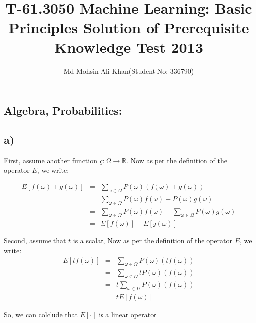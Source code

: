 \documentclass{article}
\begin{document}
\title{T-61.3050 Machine Learning: Basic Principles 
Solution of Prerequisite Knowledge Test 2013
}
\author{Md Mohsin Ali Khan(Student No: 336790)}

\maketitle


\begin{scriptsize}


\section{Algebra, Probabilities:}

\subsection*{a)}


First, assume another function $g:\Omega \rightarrow \mathbb{R}$. Now as per the definition of the operator $E$, we write:

\begin{eqnarray*}
E[f(\omega) + g(\omega)] &=& \sum_{\omega \in \Omega} P(\omega)(f(\omega)+g(\omega)) \\
&=& \sum_{\omega \in \Omega} P(\omega)f(\omega)+ P(\omega)g(\omega) \\
&=& \sum_{\omega \in \Omega} P(\omega)f(\omega)+ \sum_{\omega \in \Omega}P(\omega)g(\omega) \\
&=& E[f(\omega)] + E[g(\omega)]
\end{eqnarray*}

Second, assume that $t$ is a scalar, Now as per the definition of the operator $E$, we write:
\begin{eqnarray*}
E[tf(\omega)] &=& \sum_{\omega \in \Omega} P(\omega)(tf(\omega)) \\
&=& \sum_{\omega \in \Omega}tP(\omega)(f(\omega)) \\
&=& t\sum_{\omega \in \Omega} P(\omega)(f(\omega))\\
&=& tE[f(\omega)]
\end{eqnarray*}

So, we can colclude that $E[\cdot]$ is a linear operator



\end{scriptsize}
\end{document}

